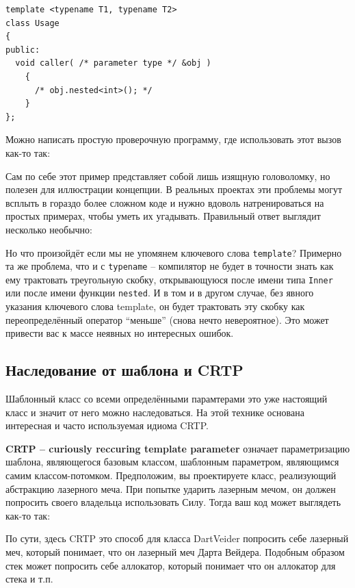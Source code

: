 \documentclass[a4paper,12pt,oneside]{article}
\begin{document}
\begin{lstlisting}
template <typename T1, typename T2>
class Usage
{
public:
  void caller( /* parameter type */ &obj )
    {
      /* obj.nested<int>(); */
    }
};
\end{lstlisting}

Можно написать простую проверочную программу, где использовать этот вызов как-то так:



Сам по себе этот пример представляет собой лишь изящную головоломку, но полезен для иллюстрации концепции. В реальных проектах эти проблемы могут всплыть в гораздо более сложном коде и нужно вдоволь натренироваться на простых примерах, чтобы уметь их угадывать. Правильный ответ выглядит несколько необычно:



Но что произойдёт если мы не упомянем ключевого слова \lstinline!template!? Примерно та же проблема, что и с \lstinline!typename! -- компилятор не будет в точности знать как ему трактовать треугольную скобку, открывающуюся после имени типа \lstinline!Inner! или после имени функции \lstinline!nested!. И в том и в другом случае, без явного указания ключевого слова template, он будет трактовать эту скобку как переопределённый оператор ``меньше'' (снова нечто невероятное). Это может привести вас к массе неявных но интересных ошибок.

\subsection{Наследование от шаблона и CRTP}

Шаблонный класс со всеми определёнными парамтерами это уже настоящий класс и значит от него можно наследоваться. На этой технике основана интересная и часто используемая идиома CRTP.

\textbf{CRTP – curiously reccuring template parameter} означает параметризацию шаблона, являющегося базовым классом, шаблонным параметром, являющимся самим классом-потомком. Предположим, вы проектируете класс, реализующий абстракцию лазерного меча. При попытке ударить лазерным мечом, он должен попросить своего владельца использовать Силу. Тогда ваш код может выглядеть как-то так:



По сути, здесь CRTP это способ для класса DartVeider попросить себе лазерный меч, который понимает, что он лазерный меч Дарта Вейдера. Подобным образом стек может попросить себе аллокатор, который понимает что он аллокатор для стека и т.п.
\end{document}
